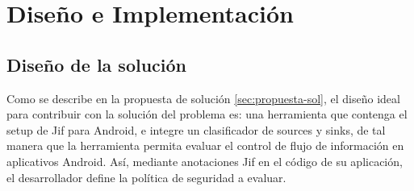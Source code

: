 \label{ch:desing}
\chapter{Diseño e Implementación}


\section{Diseño de la solución}
Como se describe en la propuesta de solución \ref{sec:propuesta-sol}, el
diseño ideal para contribuir con la solución del problema es: una herramienta
que contenga el setup de Jif para Android, e integre un clasificador de
sources y sinks, de tal manera que la herramienta permita evaluar el control de
flujo de información en aplicativos Android. Así, mediante anotaciones Jif en el
código de su aplicación, el desarrollador define la política de seguridad a evaluar.

